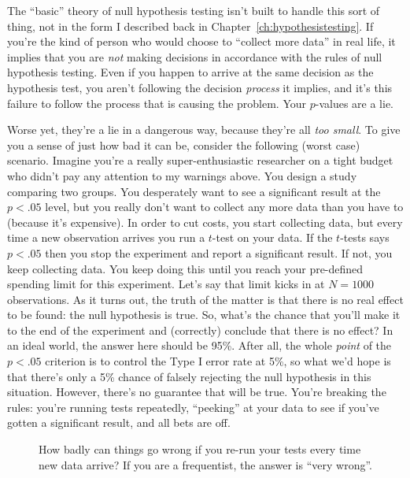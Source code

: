 \noindent
The ``basic'' theory of null hypothesis testing isn't built to handle this sort of thing, not in the form I described back in Chapter~\ref{ch:hypothesistesting}. If you're the kind of person who would choose to ``collect more data'' in real life, it implies that you are {\it not} making decisions in accordance with the rules of null hypothesis testing. Even if you happen to arrive at the same decision as the hypothesis test, you aren't following the decision {\it process} it implies, and it's this failure to follow the process that is causing the problem. Your $p$-values are a lie.

Worse yet, they're a lie in a dangerous way, because they're all {\it too small}. To give you a sense of just how bad it can be, consider the following (worst case) scenario. Imagine you're a really super-enthusiastic researcher on a tight budget who didn't pay any attention to my warnings above. You design a study comparing two groups. You desperately want to see a significant result at the $p<.05$ level, but you really don't want to collect any more data than you have to (because it's expensive). In order to cut costs, you start collecting data, but every time a new observation arrives you run a $t$-test on your data. If the $t$-tests says $p<.05$ then you stop the experiment and report a significant result. If not, you keep collecting data. You keep doing this until you reach your pre-defined spending limit for this experiment. Let's say that limit kicks in at $N=1000$ observations. As it turns out, the truth of the matter is that there is no real effect to be found: the null hypothesis is true. So, what's the chance that you'll make it to the end of the experiment and (correctly) conclude that there is no effect? In an ideal world, the answer here should be 95\%. After all, the whole {\it point} of the $p<.05$ criterion is to control the Type I error rate at 5\%, so what we'd hope is that there's only a 5\% chance of falsely rejecting the null hypothesis in this situation. However, there's no guarantee that will be true. You're breaking the rules: you're running tests repeatedly, ``peeking'' at your data to see if you've gotten a significant result, and all bets are off. 



\begin{figure}[t]
\begin{center}
\caption{How badly can things go wrong if you re-run your tests every time new data arrive? If you are a frequentist, the answer is ``very wrong''.}
\label{fig:type1}
\HR
\end{center}
\end{figure}

